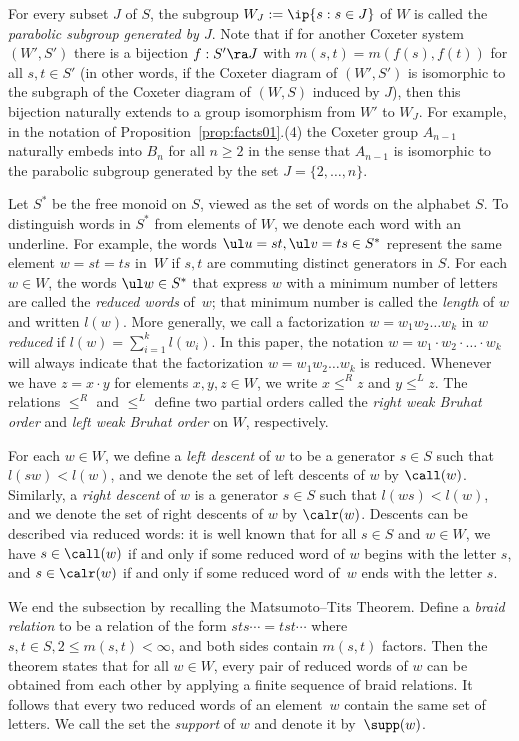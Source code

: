 For every subset $J$ of $S$, the subgroup $W_J:=\ip{s:s\in J}$ of $W$ is called the \emph{parabolic
subgroup generated by $J$}. Note that if for another Coxeter system $(W',S')$ there is a bijection
$f: S'\ra J$ with $m(s,t)=m(f(s),f(t))$ for all $s,t\in S'$ (in other words, if the Coxeter diagram
of $(W',S')$ is isomorphic to the subgraph of the Coxeter diagram of $(W,S)$ induced by $J$), then
this bijection naturally extends to a group isomorphism from $W'$ to $W_J$. For example, in the
notation of Proposition~\ref{prop:facts01}.(4) the Coxeter group $A_{n-1}$ naturally embeds into $B_{n}$ for
all $n\ge 2$ in the sense that $A_{n-1}$ is isomorphic to the parabolic subgroup generated by the
set $J=\{2,\dots,n\}$. 

Let $S^*$ be the free monoid on $S$, viewed as the set of words on the alphabet $S$. To distinguish
words in $S^*$ from elements of $W$, we denote each word with an underline.  For example, the words
$\ul u=st, \ul v=ts\in S^*$ represent the same element $w=st=ts$ in~$W$ if $s,t$ are commuting
distinct generators in $S$.  For each $w\in W$, the words $\ul w\in S^*$ that express $w$ with a
minimum number of letters are called the \emph{reduced words} of~$w$; that minimum number is called
the \emph{length} of $w$ and written $l(w)$. More generally, we call a factorization $w=w_1w_2\dots
w_k$ in $w$ \emph{reduced} if $l(w)=\sum_{i=1}^k l(w_i)$. In this paper, the notation $w=w_1\cdot
w_2\cdot \dots \cdot w_k$ will always indicate that the factorization $w=w_1w_2\dots w_k$ is
reduced.  Whenever we have $z=x\cdot y$ for elements $x,y,z\in W$, we write $x\le^R z$ and $y\le^L
z$. The relations $\le^R$ and $\le^L$ define two partial orders called the \emph{right weak Bruhat
order} and \emph{left weak Bruhat order} on $W$, respectively.

For each $w\in W$, we define a \emph{left descent} of $w$ to be a generator $s\in S$ such that
$l(sw)<l(w)$, and we denote the set of left descents of $w$ by $\call(w)$. Similarly, a \emph{right
descent} of $w$ is a generator $s\in S$ such that $l(ws)<l(w)$, and we denote the set of right
descents of $w$ by $\calr(w)$. Descents can be described via reduced words: it is well known that
for all $s\in S$ and $w\in W$, we have $s\in \call(w)$ if and only if some reduced word of $w$
begins with the letter $s$, and $s\in \calr(w)$ if and only if some reduced word of~$w$ ends with
the letter $s$.  

We end the subsection by recalling the Matsumoto--Tits Theorem. Define a \emph{braid relation} to be
a relation of the form $sts\cdots=tst\cdots$ where $s,t\in S, 2\le m(s,t)<\infty$, and both sides
contain $m(s,t)$ factors. Then the theorem states that for all $w\in W$, every pair of reduced words
of $w$ can be obtained from each other by applying a finite sequence of braid relations. It follows
that every two reduced words of an element~$w$ contain the same set of letters. We call the set the
\emph{support} of $w$ and denote it by~$\supp(w)$.

